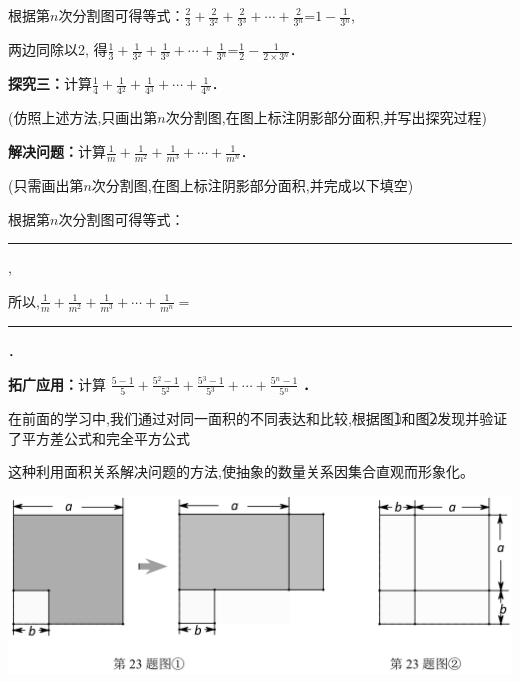 \documentclass[10pt,a4paper]{ctexart}
\newcommand{\nianfen}[1]{\hspace{-2em}{(#1\textbf{·}\textit{青岛}\textbf{·}23)}}
\newcommand{\ckong}{\rule{14em}{0.5pt}}
\begin{document}
	
	根据第$n$次分割图可得等式：${{\frac{{{2}}}{{{3}}}}{+}{\frac{{{2}}}{{{3}{^{{2}}}}}}{+}{\frac{{{2}}}{{{3}{^{{3}}}}}}{+}{\cdots 
		}{+}{\frac{{{2}}}{{{3}{^{{n}}}}}}}$=${{1}{-}{\frac{{{1}}}{{{3}{^{{n}}}}}}}$,
	
	两边同除以2, 
	得${{\frac{{{1}}}{{{3}}}}{+}{\frac{{{1}}}{{{3}{^{{2}}}}}}{+}{\frac{{{1}}}{{{3}{^{{3}}}}}}{+}{\cdots 
		}{+}{\frac{{{1}}}{{{3}{^{{n}}}}}}}$=${{\frac{{{1}}}{{{2}}}}{-}{\frac{{{1}}}{{{2}{\times 
					}{3}{^{{n}}}}}}}$．

	\textbf{探究三：}计算${{\frac{{{1}}}{{{4}}}}{+}{\frac{{{1}}}{{{4}{^{{2}}}}}}{+}{\frac{{{1}}}{{{4}{^{{3}}}}}}{+}{\cdots 
		}{+}{\frac{{{1}}}{{{4}{^{{n}}}}}}}$．
	
	(仿照上述方法,只画出第$n$次分割图,在图上标注阴影部分面积,并写出探究过程)
	
	\rule{0em}{8em}
	
	\textbf{解决问题：}计算${{\frac{{{1}}}{{{m}}}}{+}{\frac{{{1}}}{{{m}{^{{2}}}}}}{+}{\frac{{{1}}}{{{m}{^{{3}}}}}}{+}{\cdots 
		}{+}{\frac{{{1}}}{{{m}{^{{n}}}}}}}$．
	
	(只需画出第$n$次分割图,在图上标注阴影部分面积,并完成以下填空)
	
	根据第$n$次分割图可得等式：\ckong,
	
	所以,${{\frac{{{1}}}{{{m}}}}{+}{\frac{{{1}}}{{{m}{^{{2}}}}}}{+}{\frac{{{1}}}{{{m}{^{{3}}}}}}{+}{\cdots 
		}{+}{\frac{{{1}}}{{{m}{^{{n}}}}}}}=$\ckong．
	
	\textbf{拓广应用：}计算 
	${{\frac{{{5}{-}{1}}}{{{5}}}}{+}{\frac{{{5}{^{{2}}}{-}{1}}}{{{5}{^{{2}}}}}}{+}{\frac{{{5}{^{{3}}}{-}{1}}}{{{5}{^{{3}}}}}}{+}{\cdots 
		}{+}{\frac{{{5}{^{{n}}}{-}{1}}}{{{5}{^{{n}}}}}}}$\textbf{ 
		．}
	
	\rule{0em}{4em}
	
	\rule{0em}{4em}
	
	\nianfen{2013}在前面的学习中,我们通过对同一面积的不同表达和比较,根据图\textcircled{1}和图\textcircled{2}发现并验证了平方差公式和完全平方公式
	
	这种利用面积关系解决问题的方法,使抽象的数量关系因集合直观而形象化。
	
	\begin{center}
		\includegraphics[width=0.9\linewidth]{23/2013a}
	\end{center}
	
\end{document}
